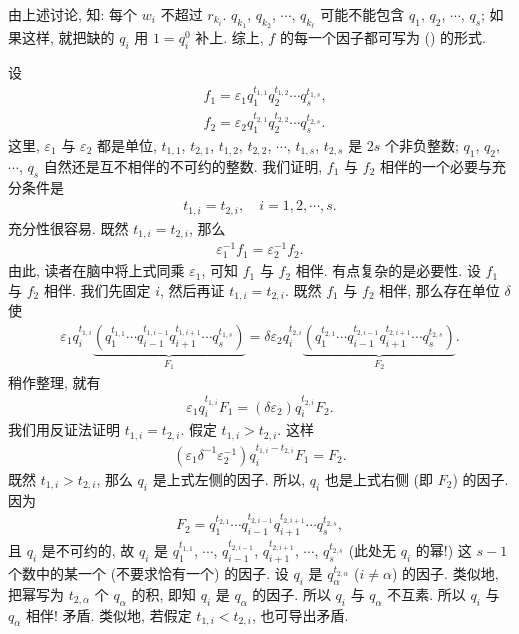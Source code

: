 \begin{pf}
    由上述讨论, 知: 每个 $w_i$ 不超过 $r_{k_i}$. $q_{k_1}$, $q_{k_2}$, $\cdots$, $q_{k_\ell}$ 可能不能包含 $q_1$, $q_2$, $\cdots$, $q_s$; 如果这样, 就把缺的 $q_i$ 用 $1 = q_i^0$ 补上. 综上, $f$ 的每一个因子都可写为 () 的形式.

    设
    \begin{align*}
         & f_1 = \varepsilon_1 q_1^{t_{1,1}} q_2^{t_{1,2}} \cdots q_s^{t_{1,s}}, \\
         & f_2 = \varepsilon_2 q_1^{t_{2,1}} q_2^{t_{2,2}} \cdots q_s^{t_{2,s}}.
    \end{align*}
    这里, $\varepsilon_1$ 与 $\varepsilon_2$ 都是单位, $t_{1,1}$, $t_{2,1}$, $t_{1,2}$, $t_{2,2}$, $\cdots$, $t_{1,s}$, $t_{2,s}$ 是 $2s$ 个非负整数; $q_1$, $q_2$, $\cdots$, $q_s$ 自然还是互不相伴的不可约的整数. 我们证明, $f_1$ 与 $f_2$ 相伴的一个必要与充分条件是
    \begin{align*}
        t_{1,i} = t_{2,i}, \quad i = 1,2,\cdots,s.
    \end{align*}
    充分性很容易. 既然 $t_{1,i} = t_{2,i}$, 那么
    \begin{align*}
        \varepsilon_1^{-1} f_1 = \varepsilon_2^{-1} f_2.
    \end{align*}
    由此, 读者在脑中将上式同乘 $\varepsilon_1$, 可知 $f_1$ 与 $f_2$ 相伴. 有点复杂的是必要性. 设 $f_1$ 与 $f_2$ 相伴. 我们先固定 $i$, 然后再证 $t_{1,i} = t_{2,i}$. 既然 $f_1$ 与 $f_2$ 相伴, 那么存在单位 $\delta$ 使
    \begin{align*}
        \varepsilon_1 q_i^{t_{1,i}} \underbrace{\left(q_1^{t_{1,1}} \cdots q_{i-1}^{t_{1,i-1}} q_{i+1}^{t_{1,i+1}} \cdots q_s^{t_{1,s}}\right)}_{F_1} = \delta \varepsilon_2 q_i^{t_{2,i}} \underbrace{\left(q_1^{t_{2,1}} \cdots q_{i-1}^{t_{2,i-1}} q_{i+1}^{t_{2,i+1}} \cdots q_s^{t_{2,s}}\right)}_{F_2}.
    \end{align*}
    稍作整理, 就有
    \begin{align*}
        \varepsilon_1 q_i^{t_{1,i}} F_1 = (\delta \varepsilon_2) q_i^{t_{2,i}} F_2.
    \end{align*}
    我们用反证法证明 $t_{1,i} = t_{2,i}$. 假定 $t_{1,i} > t_{2,i}$. 这样
    \begin{align*}
        (\varepsilon_1 \delta^{-1} \varepsilon_2^{-1}) q_i^{t_{1,i} - t_{2,i}} F_1 = F_2.
    \end{align*}
    既然 $t_{1,i} > t_{2,i}$, 那么 $q_i$ 是上式左侧的因子. 所以, $q_i$ 也是上式右侧 (即 $F_2$) 的因子. 因为
    \begin{align*}
        F_2 = q_1^{t_{2,1}} \cdots q_{i-1}^{t_{2,i-1}} q_{i+1}^{t_{2,i+1}} \cdots q_s^{t_{2,s}},
    \end{align*}
    且 $q_i$ 是不可约的, 故 $q_i$ 是 $q_1^{t_{1,1}}$, $\cdots$, $q_{i-1}^{t_{2,i-1}}$, $q_{i+1}^{t_{2,i+1}}$, $\cdots$, $q_s^{t_{2,s}}$ (此处无 $q_i$ 的幂!) 这 $s-1$ 个数中的某一个 (不要求恰有一个) 的因子. 设 $q_i$ 是 $q_\alpha^{t_{2,\alpha}}$ ($i \neq \alpha$) 的因子. 类似地, 把幂写为 $t_{2,\alpha}$ 个 $q_\alpha$ 的积, 即知 $q_i$ 是 $q_\alpha$ 的因子. 所以 $q_i$ 与 $q_\alpha$ 不互素. 所以 $q_i$ 与 $q_\alpha$ 相伴! 矛盾. 类似地, 若假定 $t_{1,i} < t_{2,i}$, 也可导出矛盾.


\end{pf}
